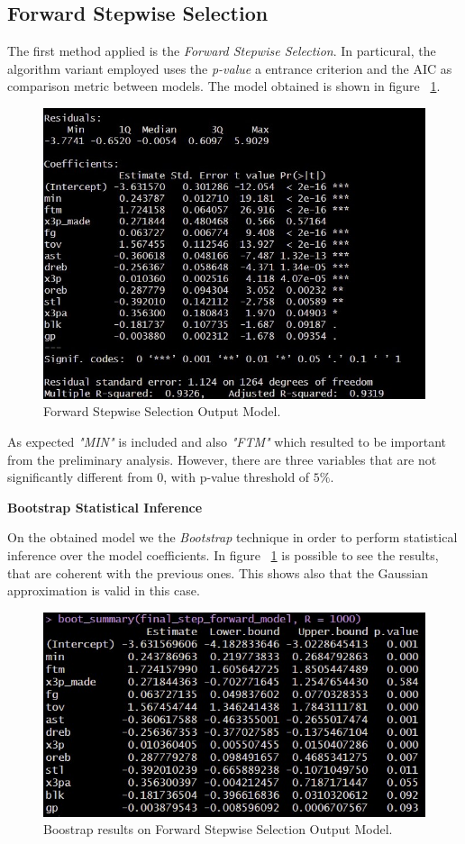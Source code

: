 \subsection{Forward Stepwise Selection}

The first method applied is the \textit{Forward Stepwise Selection}. In particural, the algorithm variant employed uses the \textit{p-value} a entrance criterion and the AIC as comparison metric between models. The model obtained is shown in figure \Fig~\ref{fig:ForwardModelSummary}.
\begin{figure}[h]
	\centering
	\includegraphics[width=0.35\linewidth]{ImageFiles/Regression/Forward/ForwardModelSummary}
	\caption{Forward Stepwise Selection Output Model.}
	\label{fig:ForwardModelSummary}
\end{figure}

As expected \textit{"MIN"} is included and also \textit{"FTM"} which resulted to be important from the preliminary analysis. However, there are three variables that are not significantly different from 0, with p-value threshold of $5\%$.

\vspace{0.2cm}
\textbf{Bootstrap Statistical Inference}

On the obtained model we the \textit{Bootstrap} technique in order to perform statistical inference over the model coefficients. In figure \Fig~\ref{fig:ForwardModelSummary} is possible to see the results, that are coherent with the previous ones. This shows also that the Gaussian approximation is valid in this case.
\begin{figure}[h]
	\centering
	\includegraphics[width=0.4\linewidth]{ImageFiles/Regression/Forward/BootForwardModel}
	\caption{Boostrap results on Forward Stepwise Selection Output Model.}
	\label{fig:BootForwardModel}
\end{figure}

